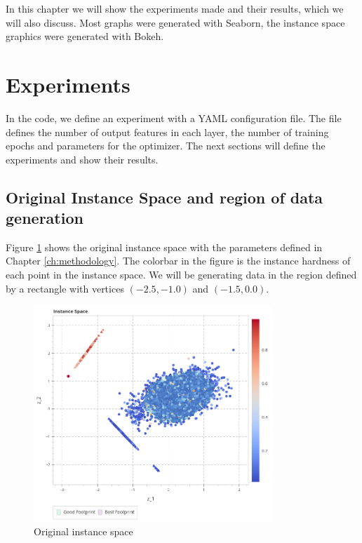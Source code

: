 In this chapter we will show the experiments made and their results, which we will also discuss. Most graphs were generated with Seaborn, the instance space graphics were generated with Bokeh.

\section{Experiments} \label{sec:experiments}

In the code, we define an experiment with a YAML configuration file. The file defines the number of output features in each layer, the number of training epochs and parameters for the optimizer. The next sections will define the experiments and show their results.

\subsection{Original Instance Space and region of data generation}

Figure \ref{fig:is_original} shows the original instance space with the parameters defined in Chapter \ref{ch:methodology}. The colorbar in the figure is the instance hardness of each point in the instance space. We will be generating data in the region defined by a rectangle with vertices $(-2.5, -1.0)$ and $(-1.5, 0.0)$.

\begin{figure}[H]
    \centering
    \includegraphics[width=0.8\textwidth]{Cap5/is_original}
    \caption{Original instance space}
    \label{fig:is_original}
\end{figure}

